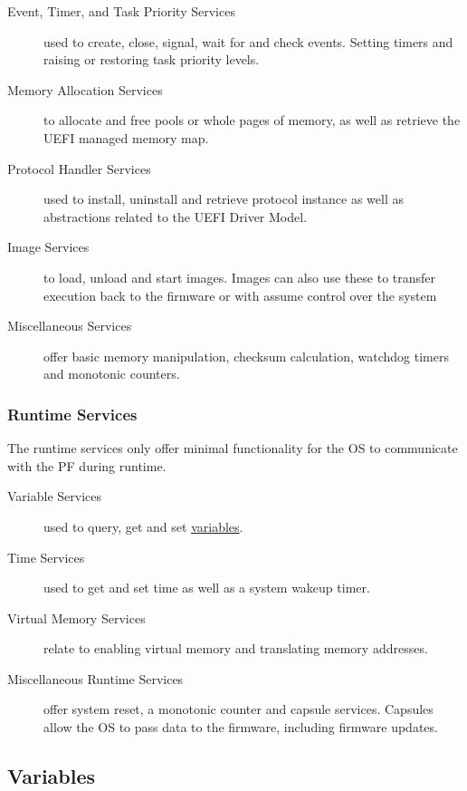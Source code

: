 \begin{description}
    \item [Event, Timer, and Task Priority Services] used to create, close, signal, wait for and check events. Setting timers and raising or restoring task priority levels.
    \item [Memory Allocation Services] to allocate and free pools or whole pages of memory, as well as retrieve the \ac{UEFI} managed memory map.
    \item [Protocol Handler Services] used to install, uninstall and retrieve protocol instance as well as abstractions related to the \ac{UEFI} Driver Model.
    \item [Image Services] to load, unload and start images. Images can also use these to transfer execution back to the firmware or with  assume control over the system
    \item [Miscellaneous Services] offer basic memory manipulation, checksum calculation, watchdog timers and monotonic counters.
\end{description}

\subsubsection{Runtime Services}

The runtime services only offer minimal functionality for the \ac{OS} to communicate with the \ac{PF} during runtime.

\begin{description}
    \item [Variable Services] used to query, get and set \hyperref[sec:uefi-pi:uefi:variables]{variables}.
    \item [Time Services] used to get and set time as well as a system wakeup timer.
    \item [Virtual Memory Services] relate to enabling virtual memory and translating memory addresses.
    \item [Miscellaneous Runtime Services] offer system reset, a monotonic counter and capsule services. Capsules allow the \ac{OS} to pass data to the firmware, including firmware updates.
\end{description}

\subsection{Variables}
\label{sec:uefi-pi:uefi:variables}

